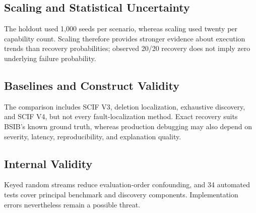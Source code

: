 \subsection{Scaling and Statistical Uncertainty}

The holdout used 1,000 seeds per scenario, whereas scaling used twenty per capability count. Scaling therefore provides stronger evidence about execution trends than recovery probabilities; observed 20/20 recovery does not imply zero underlying failure probability.

\subsection{Baselines and Construct Validity}

The comparison includes SCIF V3, deletion localization, exhaustive discovery, and SCIF V4, but not every fault-localization method. Exact recovery suits BSIB's known ground truth, whereas production debugging may also depend on severity, latency, reproducibility, and explanation quality.

\subsection{Internal Validity}

Keyed random streams reduce evaluation-order confounding, and 34 automated tests cover principal benchmark and discovery components. Implementation errors nevertheless remain a possible threat.
